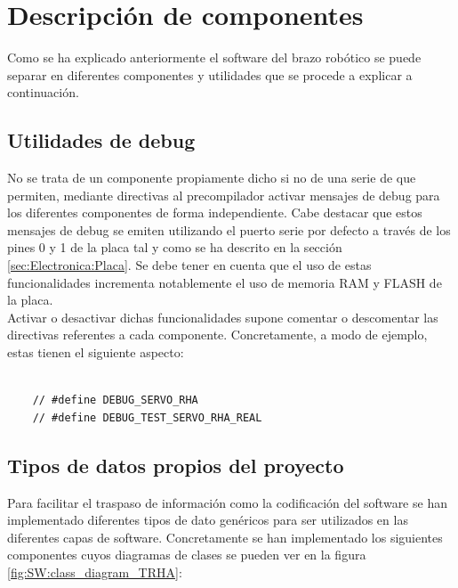 \section{Descripción de componentes} \label{sec:SW:descripcion_componentes}

Como se ha explicado anteriormente el software del brazo robótico se puede separar en diferentes componentes y utilidades que se procede a explicar a continuación.
    \subsection{Utilidades de debug} \label{subsec:SW:debug}
        No se trata de un componente propiamente dicho si no de una serie de  que permiten, mediante directivas al precompilador activar mensajes de debug para los diferentes componentes de forma independiente. Cabe destacar que estos mensajes de debug se emiten utilizando el puerto serie por defecto a través de los pines 0 y 1 de la placa tal y como se ha descrito en la sección \ref{sec:Electronica:Placa}. Se debe tener en cuenta que el uso de estas funcionalidades incrementa notablemente el uso de memoria RAM y FLASH de la placa.
        \\
        
        Activar o desactivar dichas funcionalidades supone comentar o descomentar las directivas referentes a cada componente.  Concretamente, a modo de ejemplo, estas tienen el siguiente aspecto:
        \lstset{language=C, breaklines=true, basicstyle=\footnotesize}
        \begin{lstlisting}[frame=single]

    // #define DEBUG_SERVO_RHA
    // #define DEBUG_TEST_SERVO_RHA_REAL

        \end{lstlisting}
    \subsection{Tipos de datos propios del proyecto} \label{subsec:SW:rhatypes}
        Para facilitar el traspaso de información como la codificación del software se han implementado diferentes tipos de dato genéricos para ser utilizados en las diferentes capas de software. Concretamente se han implementado los siguientes componentes cuyos diagramas de clases se pueden ver en la figura \ref{fig:SW:class_diagram_TRHA}:

